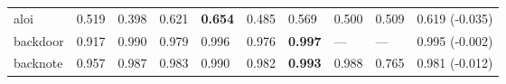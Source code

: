 \begin{table}[ht]
\begin{tabular}{l|llllllll|l}
%  
   \hline
aloi & 0.519 & 0.398 & 0.621 & \textbf{0.654} & 0.485 & 0.569 & 0.500 & 0.509 & 0.619 \tiny{(-0.035)} \\ 
  backdoor & 0.917 & 0.990 & 0.979 & 0.996 & 0.976 & \textbf{0.997} & --- & --- & 0.995 \tiny{(-0.002)} \\ 
  backnote & 0.957 & 0.987 & 0.983 & 0.990 & 0.982 & \textbf{0.993} & 0.988 & 0.765 & 0.981 \tiny{(-0.012)} \\ 

\end{tabular}
\end{table}
